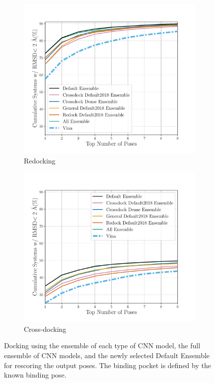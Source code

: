 \documentclass[journal=jcisd8,manuscript=article]{achemso}
\begin{document}
\begin{figure}
	\begin{subfigure}[b]{0.48\textwidth}
		\centering
		\includegraphics[width=\textwidth]{figures/redocking/rescore_ensembles_line.pdf}
		\caption{Redocking}
		\label{fig:RescoreEnsembleRedock}
        \end{subfigure}    
	\begin{subfigure}[b]{0.48\textwidth} 
		\centering
		\includegraphics[width=\textwidth]{figures/crossdocking/rescore_ensembles_line.pdf}
		\caption{Cross-docking}
		\label{fig:RescoreEnsembleCrossdock}
        \end{subfigure}    
	\caption{Docking using the ensemble of each type of CNN model, the full ensemble of CNN models, and the newly selected Default Ensemble for rescoring the output poses. The binding pocket is defined by the known binding pose.}
	\label{fig:RescoreEnsemble}
\end{figure}    
\end{document}
